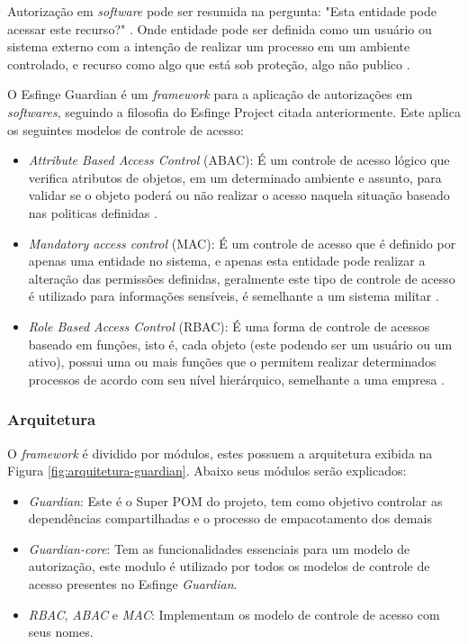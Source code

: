 \par Autorização em \textit{software} pode ser resumida na pergunta: "Esta entidade pode acessar este recurso?" \cite{sandhu1994access}. Onde entidade pode ser definida como um usuário ou sistema externo com a intenção de realizar um processo em um ambiente controlado, e recurso como algo que está sob proteção, algo não publico \cite{bartsch2011authorization}.
\par O Esfinge Guardian é um \textit{framework} para a aplicação de autorizações em \textit{softwares}, seguindo a filosofia do Esfinge Project citada anteriormente. Este aplica os seguintes modelos de controle de acesso:

\begin{itemize}
    \item \textit{Attribute Based Access Control} (ABAC): É um controle de acesso lógico que verifica atributos de objetos, em um determinado ambiente e assunto, para validar se o objeto poderá ou não realizar o acesso naquela situação baseado nas politicas definidas \cite{hu2015attribute}.
    
    \item \textit{Mandatory access control} (MAC): É um controle de acesso que é definido por apenas uma entidade no sistema, e apenas esta entidade pode realizar a alteração das permissões definidas, geralmente este tipo de controle de acesso é utilizado para informações sensíveis, é semelhante a um sistema militar \cite{lindqvist2006mandatory}.
    \item \textit{Role Based Access Control} (RBAC): É uma forma de controle de acessos baseado em funções, isto é, cada objeto (este podendo ser um usuário ou um ativo), possui uma ou mais funções que o permitem realizar determinados processos de acordo com seu nível hierárquico, semelhante a uma empresa \cite{sandhu2000nist}.
\end{itemize}

\subsubsection{Arquitetura}

\par O \textit{framework} é dividido por módulos, estes possuem a arquitetura exibida na Figura \ref{fig:arquitetura-guardian}. Abaixo seus módulos serão explicados:

\begin{itemize}
    \item \textit{Guardian}: Este é o Super POM  do projeto, tem como objetivo controlar as dependências compartilhadas e o processo de empacotamento dos demais
    
    \item \textit{Guardian-core}: Tem as funcionalidades essenciais para um modelo de autorização, este modulo é utilizado por todos os modelos de controle de acesso presentes no Esfinge \textit{Guardian}.
    
    \item \textit{RBAC}, \textit{ABAC} e \textit{MAC}: Implementam os modelo de controle de acesso com seus nomes.
 
\end{itemize}

